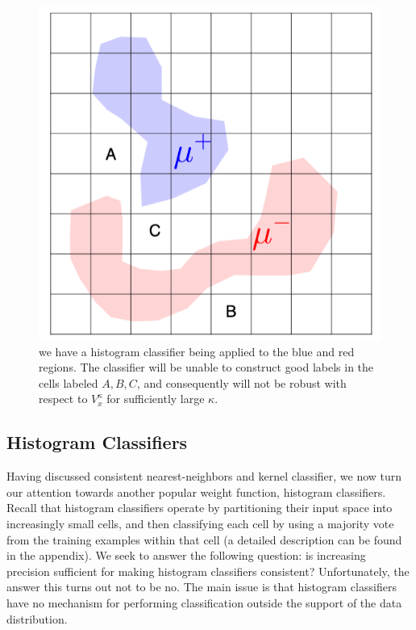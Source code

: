 \begin{figure}
    \centering
        \includegraphics[scale=0.25] {histogram_pic.png}
    \caption{we have a histogram classifier being applied to the blue and red regions. The classifier will be unable to construct good labels in the cells labeled $A, B, C$, and consequently will not be robust with respect to $V_x^{\kappa}$ for sufficiently large $\kappa$.}
    \label{fig:histogram1}
\end{figure}

\subsection{Histogram Classifiers}

Having discussed \ncons\emph{ }consistent nearest-neighbors and kernel classifier, we now turn our attention towards another popular weight function, histogram classifiers. Recall that histogram classifiers operate by partitioning their input space into increasingly small cells, and then classifying each cell by using a majority vote from the training examples within that cell (a detailed description can be found in the appendix). We seek to answer the following question: is increasing precision sufficient for making histogram classifiers \ncons\emph{ }consistent? Unfortunately, the answer this turns out not to be no. The main issue is that histogram classifiers have no mechanism for performing classification outside the support of the data distribution. 

